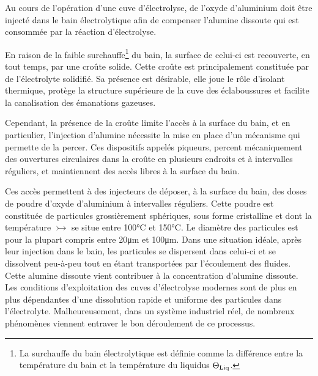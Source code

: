 
Au cours de l'opération d'une cuve d'électrolyse, de l'oxyde
d'aluminium doit être injecté dans le bain électrolytique afin
de compenser l'alumine dissoute qui est consommée par la
réaction d'électrolyse.

En raison de la faible surchauffe\footnote{La surchauffe du bain
  électrolytique est définie comme la différence entre la température
  du bain et la température du liquidus $\Theta_\text{Liq}$.} du bain, la surface
de celui-ci est recouverte, en tout temps, par une croûte
solide. Cette croûte est principalement constituée par de
l'électrolyte solidifié. Sa présence est
désirable, elle joue le rôle d'isolant thermique, protège la structure
supérieure de la cuve des éclaboussures et facilite la canalisation
des émanations gazeuses.

Cependant, la présence de la croûte limite l'accès à la surface du
bain, et en particulier, l'injection d'alumine nécessite la mise en
place d'un mécanisme qui permette de la percer. Ces dispositifs
appelés piqueurs, percent mécaniquement des ouvertures circulaires dans
la croûte en plusieurs endroits et à intervalles réguliers, et
maintiennent des accès libres à la surface du bain.

Ces accès permettent à des injecteurs de déposer, à la surface du
bain, des doses de poudre d'oxyde d'aluminium à intervalles
réguliers. Cette poudre est constituée de particules grossièrement
sphériques, sous forme cristalline et dont la température $\tinj$ se
situe entre \num{100}\si{\celsius} et \num{150}\si{\celsius}. Le
diamètre des particules est pour la plupart compris entre
\num{20}\si{\micro\meter} et \num{100}\si{\micro\meter}.
Dans une situation idéale, après leur injection dans le bain, les
particules se dispersent dans celui-ci et se dissolvent peu-à-peu tout
en étant transportées par l'écoulement des fluides. Cette alumine
dissoute vient contribuer à la concentration d'alumine dissoute. Les
conditions d'exploitation des cuves d'électrolyse modernes sont de
plus en plus dépendantes d'une dissolution rapide et uniforme des
particules dans l'électrolyte. Malheureusement, dans un système
industriel réel, de nombreux phénomènes viennent entraver le bon
déroulement de ce processus.

